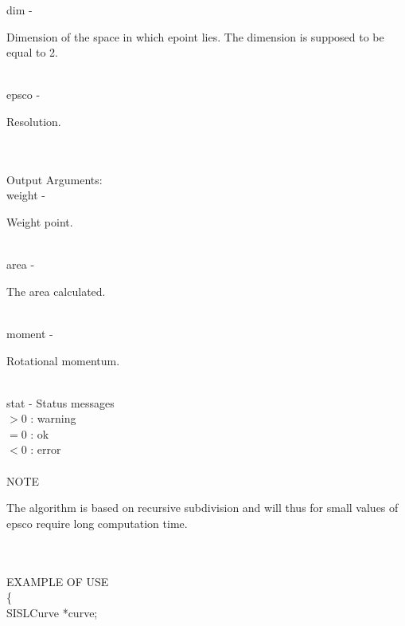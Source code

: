         \>\>    {\fov dim}\> - \>\begin{minipg2}
                                Dimension of the space in which epoint lies. The
                                dimension is supposed to be equal to 2.
                                \end{minipg2}\\[0.3ex]
        \>\>    {\fov epsco} \> - \>\begin{minipg2}
                                Resolution.
                                \end{minipg2}\\
\\
        \>Output Arguments:\\
        \>\>    {\fov weight}   \> - \>\begin{minipg2}
                                Weight point.
                                \end{minipg2}\\
        \>\>    {\fov area}     \> - \>\begin{minipg2}
                                The area calculated.
                                \end{minipg2}\\
        \>\>    {\fov moment}   \> - \>\begin{minipg2}
                                Rotational momentum.
                                \end{minipg2}\\
        \>\>    {\fov stat}     \> - \> Status messages\\
                \>\>\>\>\>              $> 0$   : warning\\
                \>\>\>\>\>              $= 0$   : ok\\
                \>\>\>\>\>              $< 0$   : error\\
\\
NOTE\\
\>\begin{minipg6}
        The algorithm is based on recursive
        subdivision and will thus for small values
        of epsco require long computation time.
\end{minipg6} \\ \\
EXAMPLE OF USE\\
                \>      \{ \\
                \>\>    SISLCurve       \>      *{\fov curve};\\
